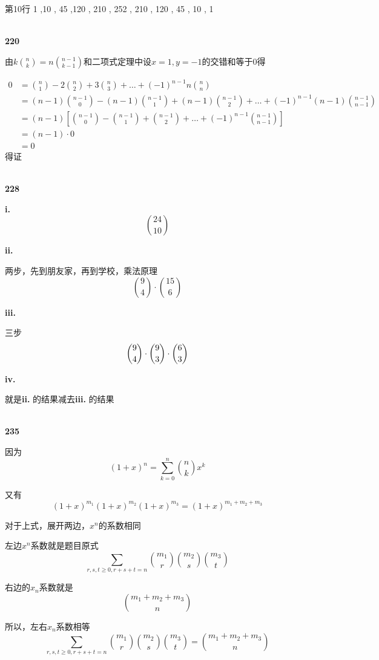 \documentclass[UTF8]{ctexart}
\begin{document}
第10行 1       ,10     , 45      ,120   ,  210    , 252  ,   210  ,   120   ,  45 ,     10   ,   1

~\\
\noindent\textbf{220}

由$k{n\choose k}=n{n-1 \choose k-1}$和二项式定理中设$x=1,y=-1$的交错和等于0得

\begin{equation}
    \nonumber
    \begin{aligned}
        0
&={n\choose 1}-2{n\choose 2}+3{n\choose 3}+\dots+(-1)^{n-1}
n{n\choose n}\\
&=(n-1){n-1\choose 0}-(n-1){n-1\choose 1}+(n-1){n-1\choose 2}+\dots
+(-1)^{n-1}(n-1){n-1\choose n-1}\\
&=(n-1)\left[{n-1\choose 0}-{n-1\choose 1}+{n-1\choose 2}+\dots
+(-1)^{n-1}{n-1\choose n-1}\right]\\
&=(n-1)\cdot 0\\
&=0
    \end{aligned}
\end{equation}
得证

~\\
\noindent\textbf{228}

\textbf{i. }$$24\choose 10$$

\textbf{ii. }

两步，先到朋友家，再到学校，乘法原理
$${9\choose 4}\cdot {15\choose 6}$$

\textbf{iii. }

三步
$$
{\dbinom{9}{4}} \cdot {\dbinom{9}{3}} \cdot {\dbinom{6}{3}} 
$$

\textbf{iv. }

就是\textbf{ii. }的结果减去\textbf{iii. }的结果

~\\
\noindent\textbf{235}

因为
$$
(1+x)^{n}=\sum ^{n}_{k=0} {n\choose k}x^k
$$

又有
$$
(1+x)^{m_1}(1+x)^{m_2}(1+x)^{m_3}=(1+x)^{m_1+m_2+m_3}
$$

对于上式，展开两边，$x^n$的系数相同

左边$x^n$系数就是题目原式
$$
\sum_{r,s,t\ge 0, r+s+t=n}{m_1\choose r}{m_2\choose s}
{m_3\choose t}
$$

右边的$x_n$系数就是
$$
{m_1+m_2+m_3\choose n}
$$

所以，左右$x_n$系数相等
$$
\sum_{r,s,t\ge 0, r+s+t=n}{m_1\choose r}{m_2\choose s}
{m_3\choose t}
=
{m_1+m_2+m_3\choose n}
$$
\end{document}
